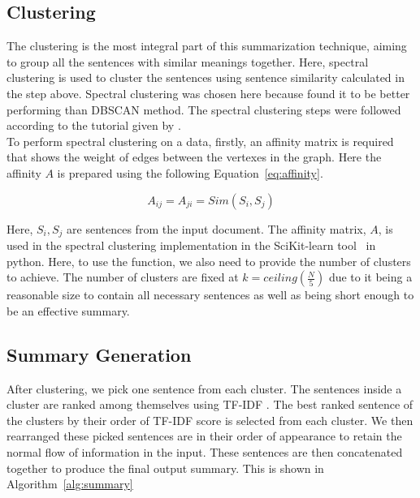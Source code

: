 \subsection{Clustering}\label{subsec:clustering}
The clustering is the most integral part of this summarization technique, aiming to group all the
sentences with similar meanings together.
Here, spectral clustering is used to cluster the sentences using sentence similarity calculated in the step above.
Spectral clustering was chosen here because \citeauthor{roychowdhury-etal-2022-spectral-base}
\cite{roychowdhury-etal-2022-spectral-base} found it to be better performing than DBSCAN method.
The spectral clustering steps were followed according to the tutorial given by
\cite{vonLuxburg-2007-spectral-tutorial}. \\

To perform spectral clustering on a data, firstly, an affinity matrix is required that shows
the weight of edges between the vertexes in the graph.
Here the affinity $A$ is prepared using the following Equation~\ref{eq:affinity}.

\begin{equation}\label{eq:affinity}
    A_{ij}=A_{ji}=Sim(S_i,S_j)
\end{equation}

Here, $S_i, S_j$ are sentences from the input document.
The affinity matrix, $A$, is used in the spectral clustering implementation in the SciKit-learn
tool~\cite{Pedregosa-2011-scikit-learn} in python.
Here, to use the function, we also need to provide the number of clusters to achieve.
The number of clusters are fixed at $k=ceiling\left(\frac{N}{5}\right)$ due to it being a
reasonable size to contain all necessary sentences as well as being short enough to be an effective summary.

\subsection{Summary Generation}\label{subsec:summary-generation}
After clustering, we pick one sentence from each cluster.
The sentences inside a cluster are ranked among themselves using TF-IDF .
The best ranked sentence of the clusters by their order of TF-IDF score is
selected from each cluster.
We then rearranged these picked sentences are in their order of appearance to retain the normal flow of
information in the input.
These sentences are then concatenated together to produce the final output summary.
This is shown in Algorithm~\ref{alg:summary}

